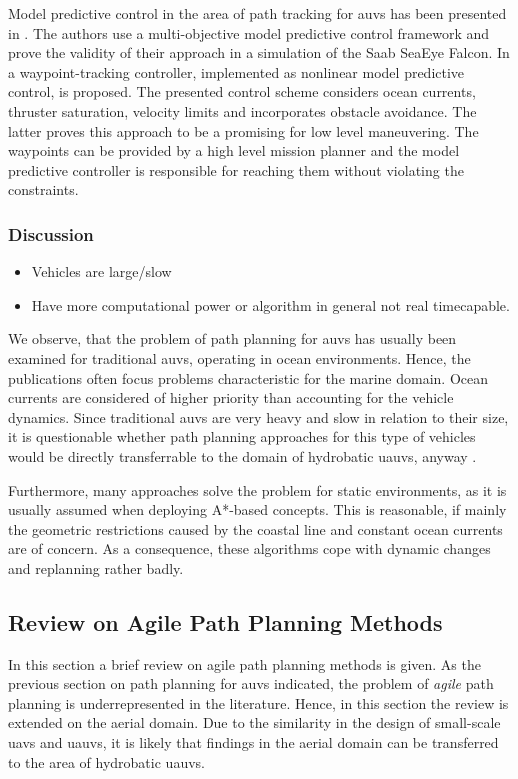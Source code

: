 Model predictive control in the area of path tracking for \acp{auv} has been presented in \cite{Shen16}. The authors use a multi-objective model predictive control framework and prove the validity of their approach in a simulation of the Saab SeaEye Falcon. In \cite{Heshmati18} a waypoint-tracking controller, implemented as nonlinear model predictive control, is proposed. The presented control scheme considers ocean currents, thruster saturation, velocity limits and incorporates obstacle avoidance. The latter proves this approach to be a promising for low level maneuvering. The waypoints can be provided by a high level mission planner and the model predictive controller is responsible for reaching them without violating the constraints.


\subsubsection{Discussion}
\begin{itemize}
    \color{red}
    \item Vehicles are large/slow
    \item Have more computational power or algorithm in general not real timecapable.
\end{itemize}

We observe, that the problem of path planning for \acp{auv} has usually been examined for traditional \acp{auv}, operating in ocean environments.
Hence, the publications often focus problems characteristic for the marine domain.
Ocean currents are considered of higher priority than accounting for the vehicle dynamics.
Since traditional \acp{auv} are very heavy and slow in relation to their size, it is questionable whether path planning approaches for this type of vehicles would be directly transferrable to the domain of hydrobatic \acp{uauv}, anyway \cite{hydrobatic}.

Furthermore, many approaches solve the problem for static environments, as it is usually assumed when deploying A*-based concepts. This is reasonable, if mainly the geometric restrictions caused by the coastal line and constant ocean currents are of concern. As a consequence, these algorithms cope with dynamic changes and replanning rather badly.

\subsection{Review on Agile Path Planning Methods}
In this section a brief review on agile path planning methods is given. As the previous section on path planning for \acp{auv} indicated, the problem of \emph{agile} path planning is underrepresented in the literature. Hence, in this section the review is extended on the aerial domain. Due to the similarity in the design of small-scale \acp{uav} and \acp{uauv}, it is likely that findings in the aerial domain can be transferred to the area of hydrobatic \acp{uauv}.


